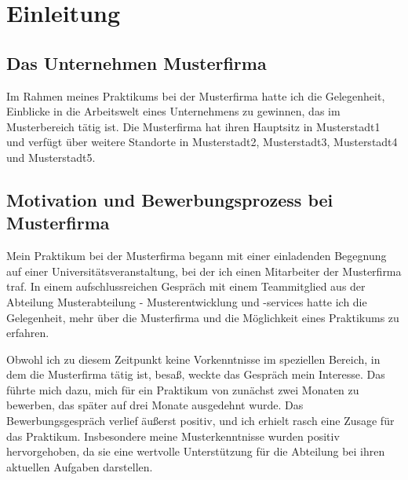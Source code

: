 %
%

\section{Einleitung}


\subsection{Das Unternehmen Musterfirma}
Im Rahmen meines Praktikums bei der Musterfirma hatte ich die Gelegenheit, Einblicke in die Arbeitswelt eines Unternehmens zu gewinnen, das im Musterbereich tätig ist. Die Musterfirma hat ihren Hauptsitz in Musterstadt1 und verfügt über weitere Standorte in Musterstadt2, Musterstadt3, Musterstadt4 und Musterstadt5.


\subsection{Motivation und Bewerbungsprozess bei Musterfirma}
Mein Praktikum bei der Musterfirma begann mit einer einladenden Begegnung auf einer Universitätsveranstaltung, bei der ich einen Mitarbeiter der Musterfirma traf. In einem aufschlussreichen Gespräch mit einem Teammitglied aus der Abteilung Musterabteilung - Musterentwicklung und -services hatte ich die Gelegenheit, mehr über die Musterfirma und die Möglichkeit eines Praktikums zu erfahren.

Obwohl ich zu diesem Zeitpunkt keine Vorkenntnisse im speziellen Bereich, in dem die Musterfirma tätig ist, besaß, weckte das Gespräch mein Interesse. Das führte mich dazu, mich für ein Praktikum von zunächst zwei Monaten zu bewerben, das später auf drei Monate ausgedehnt wurde. Das Bewerbungsgespräch verlief äußerst positiv, und ich erhielt rasch eine Zusage für das Praktikum. Insbesondere meine Musterkenntnisse wurden positiv hervorgehoben, da sie eine wertvolle Unterstützung für die Abteilung bei ihren aktuellen Aufgaben darstellen.


